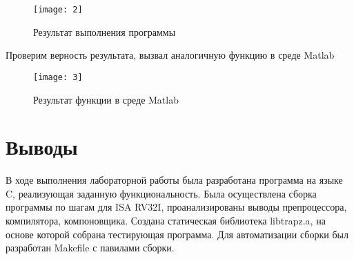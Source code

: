 \begin{figure}[H]
	\begin{center}
		\texttt{[image: 2]}
		\caption{Результат выполнения программы} 
		\label{pic:pic_name} %
	\end{center}
\end{figure}

Проверим верность результата, вызвал аналогичную функцию в среде Matlab

\begin{figure}[H]
	\begin{center}
		\texttt{[image: 3]}
		\caption{Результат функции в среде Matlab} 
		\label{pic:pic_name} %
	\end{center}
\end{figure}

\section{Выводы}
В ходе выполнения лабораторной работы была разработана программа на языке C, реализующая заданную функциональность. Была осуществлена сборка программы по шагам для ISA RV32I, проанализированы выводы препроцессора, компилятора, компоновщика. 
Создана статическая библиотека libtrapz.a, на основе которой собрана тестирующая программа. Для автоматизации сборки был разработан Makefile с павилами сборки.

